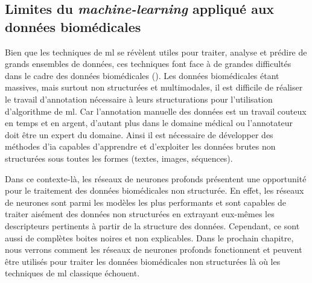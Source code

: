 \subsection{Limites du \textit{machine-learning} appliqué aux données biomédicales}
Bien que les techniques de \gls{ml} se révèlent utiles pour traiter, analyse et prédire de grands ensembles de données, ces techniques font face à de grandes difficultés dans le cadre des données biomédicales (\cite{martinez-garcia_data_2022}). Les données biomédicales étant massives, mais surtout non structurées et multimodales, il est difficile de réaliser le travail d'annotation nécessaire à leurs structurations pour l'utilisation d'algorithme de \gls{ml}. Car l'annotation manuelle des données est un travail couteux en temps et en argent, d'autant plus dans le domaine médical ou l'annotateur doit être un expert du domaine. Ainsi il est nécessaire de développer des méthodes d'\gls{ia} capables d'apprendre et d'exploiter les données brutes non structurées sous toutes les formes (textes, images, séquences).

Dans ce contexte-là, les réseaux de neurones profonds présentent une opportunité pour le traitement des données biomédicales non structurée. En effet, les réseaux de neurones sont parmi les modèles les plus performants et sont capables de traiter aisément des données non structurées en extrayant eux-mêmes les descripteurs pertinents à partir de la structure des données. Cependant, ce sont aussi de complètes boites noires et non explicables. Dans le prochain chapitre, nous verrons comment les réseaux de neurones profonds fonctionnent et peuvent être utilisés pour traiter les données biomédicales non structurées là où les techniques de \gls{ml} classique échouent.